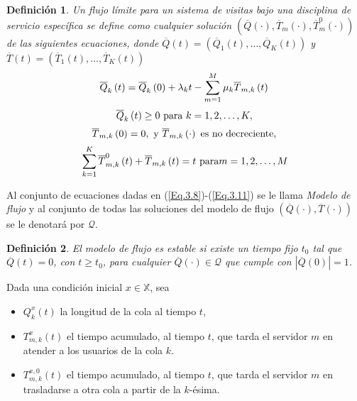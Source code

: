 \documentclass{article}
\newtheorem{Def}{Definición}[section]
\numberwithin{equation}{section}
\begin{document}
\begin{Def}
Un flujo l\'imite para un sistema de visitas bajo una disciplina de servicio espec\'ifica se define como cualquier soluci\'on
 $\left(\overline{Q}\left(\cdot\right),\overline{T}_{m}\left(\cdot\right),\overline{T}_{m}^{0}\left(\cdot\right)\right)$  de las siguientes ecuaciones, donde $\overline{Q}\left(t\right)=\left(\overline{Q}_{1}\left(t\right),\ldots,\overline{Q}_{K}\left(t\right)\right)$ y $\overline{T}\left(t\right)=\left(\overline{T}_{1}\left(t\right),\ldots,\overline{T}_{K}\left(t\right)\right)$
\begin{equation}\label{Eq.3.8}
\overline{Q}_{k}\left(t\right)=\overline{Q}_{k}\left(0\right)+\lambda_{k}t-\sum_{m=1}^{M}\mu_{k}\overline{T}_{m,k}\left(t\right)\\
\end{equation}
\begin{equation}\label{Eq.3.9}
\overline{Q}_{k}\left(t\right)\geq0\textrm{ para }k=1,2,\ldots,K,\\
\end{equation}
\begin{equation}\label{Eq.3.10}
\overline{T}_{m,k}\left(0\right)=0,\textrm{ y }\overline{T}_{m,k}\left(\cdot\right)\textrm{ es no decreciente},\\
\end{equation}
\begin{equation}\label{Eq.3.11}
\sum_{k=1}^{K}\overline{T}_{m,k}^{0}\left(t\right)+\overline{T}_{m,k}\left(t\right)=t\textrm{ para}m=1,2,\ldots,M\\
\end{equation}
\end{Def}

Al conjunto de ecuaciones dadas en (\ref{Eq.3.8})-(\ref{Eq.3.11}) se le llama {\em Modelo de flujo} y al conjunto de todas las
soluciones del modelo de flujo $\left(\overline{Q}\left(\cdot\right),\overline{T} \left(\cdot\right)\right)$ se le denotar\'a por $\mathcal{Q}$.


\begin{Def}
El modelo de flujo es estable si existe un tiempo fijo $t_{0}$ tal que $\overline{Q}\left(t\right)=0$, con $t\geq t_{0}$, para cualquier $\overline{Q}\left(\cdot\right)\in\mathcal{Q}$ que cumple con $|\overline{Q}\left(0\right)|=1$.
\end{Def}

Dada una condici\'on inicial $x\in\mathbb{X}$, sea

\begin{itemize}
\item $Q_{k}^{x}\left(t\right)$ la longitud de la cola al tiempo
$t$,

\item $T_{m,k}^{x}\left(t\right)$ el tiempo acumulado, al tiempo $t$, que tarda el servidor $m$ en atender a los usuarios de la cola $k$.

\item $T_{m,k}^{x,0}\left(t\right)$ el tiempo acumulado, al tiempo $t$, que tarda el servidor $m$ en trasladarse a otra cola a partir de la $k$-\'esima.\\
\end{itemize}
\end{document}
